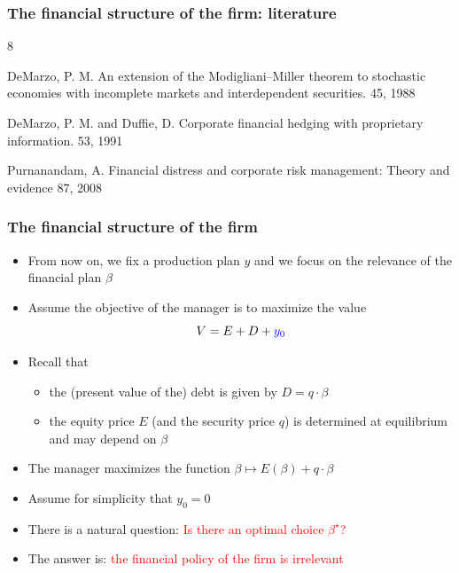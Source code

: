 \documentclass[blue]{beamer}
\theoremstyle{definition}
\theoremstyle{example}
\begin{document}
\begin{frame}\frametitle{The financial structure of the firm: literature}

\begin{thebibliography}{8}


  \beamertemplatearticlebibitems
  
   DeMarzo, P. M.
    \newblock An extension of the Modigliani--Miller theorem to stochastic economies with incomplete markets and interdependent securities.
     45, 1988
    
   DeMarzo, P. M. and Duffie, D.
    \newblock Corporate financial hedging with proprietary information.
     53, 1991

    Purnanandam, A.
    \newblock Financial distress and corporate risk management: Theory and evidence
     87, 2008


    \end{thebibliography}

\end{frame}



\begin{frame}\frametitle{The financial structure of the firm}

\begin{itemize}
\item From now on, we fix a production plan $y$ and we focus on the relevance of the financial plan $\beta$
\item Assume the objective of the manager is to maximize the value
\[
V = E + D + \textcolor{blue}{y_0}
\]
\item Recall that
    \begin{itemize}
    \item the (present value of the) debt is given by $D = q \cdot \beta$
    \item the equity price $E$ (and the security price $q$) is determined at equilibrium and may depend on $\beta$
    \end{itemize}
\item The manager maximizes the function $\beta \mapsto E(\beta) + q \cdot \beta$
\item Assume for simplicity that $y_0=0$
\item There is a natural question: \textcolor{red}{Is there an optimal choice $\beta^\star$?}
\item The answer is: \textcolor{red}{the financial policy of the firm is irrelevant}
\end{itemize}

\end{frame}
\end{document}
